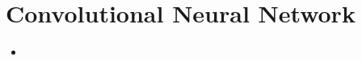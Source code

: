 \documentclass{article}
\begin{document}
\begin{enumerate}
\begin{itemize}
	\end{itemize}
\end{enumerate}

\section{Convolutional Neural Network}
\begin{itemize}
	\item
\end{itemize}
\end{document}
